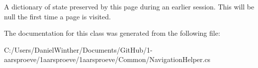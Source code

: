 A dictionary of state preserved by this page during an earlier session. This will be null the first time a page is visited. 



The documentation for this class was generated from the following file\+:\begin{DoxyCompactItemize}
\item 
C\+:/\+Users/\+Daniel\+Winther/\+Documents/\+Git\+Hub/1-\/aarsproeve/1aarsproeve/1aarsproeve/\+Common/Navigation\+Helper.\+cs\end{DoxyCompactItemize}
